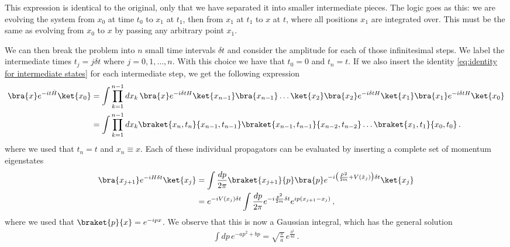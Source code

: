 This expression is identical to the original, only that we have separated it into smaller intermediate pieces. The logic goes as this: we are evolving the system from $x_0$ at time $t_0$ to $x_1$ at $t_1$, then from $x_1$ at $t_1$ to $x$ at $t$, where all positions $x_1$ are integrated over. This must be the same as evolving from $x_0$ to $x$ by passing any arbitrary point $x_1$.


We can then break the problem into $n$ small time intervals $\delta t$ and consider the amplitude for each of those infinitesimal steps. We label the intermediate times $t_j=j\delta t$ where $j=0,1,\dots,n$. With this choice we have that $t_0=0$ and $t_n=t$. If we also insert the identity \cref{eq:identity for intermediate states} for each intermediate step, we get the following expression
\begin{align}\label{eq:iterated matrix element QM}
    \bra{x}e^{-it\hat{H}}\ket{x_{0}}&=\int\prod_{k=1}^{n-1}dx_{k}\,\bra{x}e^{-i\delta t H}\ket{x_{n-1}}\bra{x_{n-1}}\dots\ket{x_2}\bra{x_2}e^{-i\delta t H}\ket{x_1}\bra{x_1}e^{-i\delta t H}\ket{x_{0}}\nonumber
    \\
    &=\int\prod_{k=1}^{n-1}dx_{k}\braket{x_n,t_n}{x_{n-1},t_{n-1}}\braket{x_{n-1},t_{n-1}}{x_{n-2},t_{n-2}}\dots\braket{x_1,t_1}{x_{0},t_{0}}\,.
\end{align}
where we used that $t_n=t$ and $x_n\equiv x$.
Each of these individual propagators can be evaluated by inserting a complete set of momentum eigenstates
\begin{align}\label{eq:}
    \bra{x_{j+1}}e^{-iH\delta t}\ket{x_j}&=\int\frac{dp}{2\pi}\braket{x_{j+1}}{p}\bra{p}e^{-i\big(\frac{\hat{P}^{2}}{2m}+V(\hat{x}_j)\big)\delta t}\ket{x_j}\nonumber
    \\
    &=e^{-iV(x_j)\delta t}\int\frac{dp}{2\pi}e^{-i\frac{p^{2}}{2m}\delta t}e^{ip(x_{j+1}-x_{j})}\,,
\end{align}
where we used that $\braket{p}{x}=e^{-ipx}$. We observe that this is now a Gaussian integral, which has the general solution
\begin{align}
    \int dp\,e^{-ap^{2}+bp}=\sqrt{\frac{\pi}{a}}\,e^{\frac{b^{2}}{4a}}\,.
\end{align}

